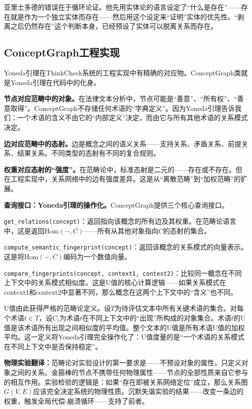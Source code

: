 \documentclass[11pt,a4paper]{book}
\theoremstyle{definition}
\begin{document}
亚里士多德的错误在于循环论证。他先用实体论的语言设定了“什么是存在”——存在就是作为一个独立实体而存在——然后用这个设定来“证明”实体的优先性。“剥离之后仍然存在”这个判断本身，已经预设了实体可以脱离关系而存在。

\subsection{ConceptGraph工程实现}

Yoneda引理在ThinkCheck系统的工程实现中有精确的对应物。ConceptGraph类就是Yoneda引理在代码中的化身。

\textbf{节点对应范畴中的对象。}在法律文本分析中，节点可能是“善意”、“所有权”、“善意取得”。ConceptGraph不存储任何术语的“字典定义”。因为Yoneda引理告诉我们：一个术语的含义不由它的“内部定义”决定，而由它与所有其他术语的关系模式决定。

\textbf{边对应范畴中的态射。}边是概念之间的语义关系——支持关系、矛盾关系、前提关系、结果关系。不同类型的态射有不同的复合规则。

\textbf{权重对应态射的“强度”。}在范畴论中，标准态射是二元的——存在或不存在。但在工程实现中，关系网络中的边有强度差异。这是从“离散范畴”到“加权范畴”的扩展。

\textbf{查询接口：Yoneda引理的操作化。}ConceptGraph提供三个核心查询接口。

\texttt{get\_relations(concept)}：返回指向该概念的所有边及其权重。在范畴论语言中，这是返回$\text{Hom}(-, C)$——所有从其他对象指向$C$的态射的集合。

\texttt{compute\_semantic\_fingerprint(concept)}：返回该概念的关系模式的向量表示。这是将$\text{Hom}(-, C)$编码为一个数值向量。

\texttt{compare\_fingerprints(concept, context1, context2)}：比较同一概念在不同上下文中的关系模式相似度。这是U值的核心计算逻辑——如果关系模式在context1和context2中显著不同，那么概念在这两个上下文中的“含义”也不同。

U值由此获得严格的范畴论定义。设$T$为待评估文本中所有关键术语的集合。对每个术语$t\in T$，设$C_t$为术语$t$在不同上下文中的“出现”所构成的对象集合。术语$t$的U值是该术语所有出现之间相似度的平均值。整个文本的U值是所有术语U值的加权平均。这一定义将Yoneda引理完全操作化了：U值度量的是“一个术语的关系模式在不同上下文中是否保持稳定”。

\textbf{物理实验翻译：}范畴论对实验设计的第一要求是——不预设对象的属性，只定义对象之间的关系。金箍棒的节点不携带任何物理属性——节点的全部性质来自它参与的相互作用。实验检验的逻辑是：如果“存在即被关系网络定位”成立，那么关系图$G(V,E)$应该完全决定系统的物理性质。沉默失谐实验的结果——改变一条边的权重，触发全局代偿-崩溃循环——支持了前者。
\end{document}
